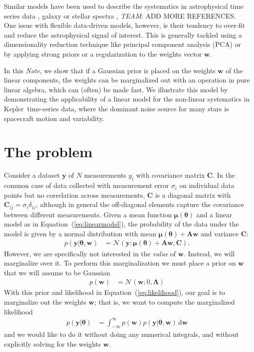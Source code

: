 \documentclass[modern]{rnaastex}
\newcommand{\project}[1]{\textsf{#1}}
\newcommand{\kepler}{\project{Kepler}}
\newcommand{\documentname}{\textsl{Note}}
\renewcommand{\eqref}[1]{\ref{eq:#1}}
\newcommand{\Eq}[1]{Equation~(\eqref{#1})}
\newcommand{\eq}[1]{\Eq{#1}}
\newcommand{\eqlabel}[1]{\label{eq:#1}}
\newcommand{\todo}[3]{{\color{#2}\emph{#1}: #3}}
\newcommand{\alltodo}[1]{\todo{TEAM}{red}{#1}}
\newcommand{\dd}{\ensuremath{\,\mathrm{d}}}
\newcommand{\bvec}[1]{{\ensuremath{\boldsymbol{#1}}}}
\newcommand{\Normal}{\ensuremath{\mathcal{N}}}
\newcommand{\mA}{\ensuremath{\bvec{A}}}
\newcommand{\mC}{\ensuremath{\bvec{C}}}
\newcommand{\mL}{\ensuremath{\bvec{\Lambda}}}
\newcommand{\vw}{\ensuremath{\bvec{w}}}
\newcommand{\vy}{\ensuremath{\bvec{y}}}
\newcommand{\vt}{\ensuremath{\bvec{\theta}}}
\newcommand{\vm}{\ensuremath{\bvec{\mu}(\bvec{\theta})}}
\begin{document}
Similar models have been used to describe the systematics in astrophysical time
series data \citep{Smith:2012, Wang:2016, Luger:2016}, galaxy or stellar spectra
\citep{Tsalmantza:2012, Ness:2015}, \alltodo{ADD MORE REFERENCES}.
One issue with flexible data-driven models, however, is their tendency to
over-fit and reduce the astrophysical signal of interest.
This is generally tackled using a dimensionality reduction technique like
principal component analysis (PCA) or by applying strong priors or a
regularization to the weights vector $\vw$.

In this \documentname, we show that if a
Gaussian prior is placed on the weights $\vw$ of the linear
components, the weights can be marginalized out with an operation in pure linear
algebra, which can (often) be made fast.
We illustrate this model by demonstrating the applicability of a linear model
for the non-linear systematics in \kepler\ time-series data, where the dominant
noise source for many stars is spacecraft motion and variability.

\section{The problem}

Consider a dataset $\vy$ of $N$ measurements $y_i$ with covariance
matrix $\mC$.
In the common case of data collected with measurement error $\sigma_i$ on
individual data points but no correlation across measurements, $\mC$ is a
diagonal matrix with $\mC_{ij} = \sigma_{i}\delta_{ij}$, although in general
the off-diagonal elements capture the covariance between different
measurements. Given a mean function $\vm$  and a linear model as in
\eq{linearmodel}, the probability of the data under the model is given by a
normal distribution with mean $\vm + \mA \vw$ and variance $\mC$:
%
\begin{align}\eqlabel{likelihood}
p(\vy | \vt, \vw) &= \Normal(\vy; \vm + \mA \vw, \mC).
\end{align}
%
However, we are specifically not interested in the \emph{value} of $\vw$.
Instead, we will marginalize over it.
To perform this marginalization we must place a prior on $\vw$ that we will
assume to be Gaussian
%
\begin{align}
p(\vw) &= \Normal(\vw; 0, \mL) \nonumber
\end{align}
%
With this prior and likelihood in \eq{likelihood}, our goal is to marginalize
out the weights $\vw$; that is, we want to compute the marginalized
likelihood
%
\begin{align}
p(\vy | \vt) &= \int_{-\infty}^{\infty} p(\vw) p(\vy | \vt, \vw) \dd\vw
\end{align}
and we would like to do it without doing any numerical integrals, and without
explicitly solving for the weights $\vw$.
\end{document}
